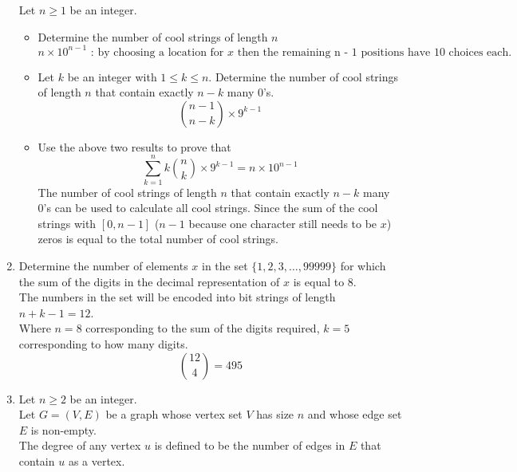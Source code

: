 \documentclass{article}
\begin{document}
\begin{enumerate}
			Let $n \geq 1$ be an integer. \\
			\begin{itemize}
				\item Determine the number of cool strings of length $n$ \\
				\begin{equation*}
					n \times 10^{n - 1}\text{ : by choosing a location for $x$ then the remaining n - 1 positions have 10 choices each.}
				\end{equation*}
				\item Let $k$ be an integer with $1 \leq k \leq n$. Determine the number of cool strings of length $n$ that contain exactly $n - k$ many 0's. \\
				\begin{equation*}
					{n - 1 \choose n - k} \times 9^{k - 1}
				\end{equation*}
				\item Use the above two results to prove that
				\begin{equation*}
					\sum_{k = 1}^{n} k {n \choose k} \times 9^{k - 1} = n \times 10^{n-1}
				\end{equation*}
				The number of cool strings of length $n$ that contain exactly $n - k$ many 0's can be used to calculate all cool strings. Since the sum of the cool strings with $[0, n - 1]$ ($n - 1$ because one character still needs to be $x$) zeros is equal to the total number of cool strings.
			\end{itemize}
		\item
			Determine the number of elements $x$ in the set $\{1, 2, 3, \ldots, 99999\}$ for which the sum of the digits in the decimal representation of $x$ is equal to 8. \\
			The numbers in the set will be encoded into bit strings of length $n + k - 1 = 12$. \\
			Where $n = 8$ corresponding to the sum of the digits required, $k = 5$ corresponding to how many digits. \\
			\begin{equation*}
				{12 \choose 4} = 495
			\end{equation*}
		\item
			Let $n \geq 2$ be an integer. \\
			Let $G = (V, E)$ be a graph whose vertex set $V$ has size $n$ and whose edge set $E$ is non-empty. \\
			The degree of any vertex $u$ is defined to be the number of edges in $E$ that contain $u$ as a vertex. \\

\end{enumerate}
\end{document}
